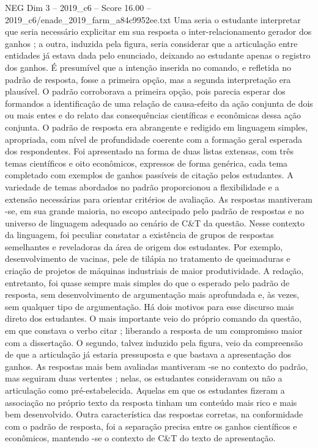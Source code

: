 \begin{textsample}{NEG Dim 3 – 2019\_c6 – Score 16.00 – 2019\_c6/enade\_2019\_farm\_a84c9952ee.txt}
Uma seria o estudante interpretar que seria necessário explicitar em sua resposta o inter-relacionamento gerador dos ganhos ; a outra, induzida pela figura, seria considerar que a articulação entre entidades já estava dada pelo enunciado, deixando ao estudante apenas o registro dos ganhos.
É presumível que a intenção inserida no comando, e refletida no padrão de resposta, fosse a primeira opção, mas a segunda interpretação era plausível.
O padrão corroborava a primeira opção, pois parecia esperar dos formandos a identificação de uma relação de causa-efeito da ação conjunta de dois ou mais entes e do relato das consequências científicas e econômicas dessa ação conjunta.
O padrão de resposta era abrangente e redigido em linguagem simples, apropriada, com nível de profundidade coerente com a formação geral esperada dos respondentes.
Foi apresentado na forma de duas listas extensas, com três temas científicos e oito econômicos, expressos de forma genérica, cada tema completado com exemplos de ganhos passíveis de citação pelos estudantes.
A variedade de temas abordados no padrão proporcionou a flexibilidade e a extensão necessárias para orientar critérios de avaliação.
As respostas mantiveram -se, em sua grande maioria, no escopo antecipado pelo padrão de respostas e no universo de linguagem adequado ao cenário de C\&T da questão.
Nesse contexto da linguagem, foi peculiar constatar a existência de grupos de respostas semelhantes e reveladoras da área de origem dos estudantes.
Por exemplo, desenvolvimento de vacinas, pele de tilápia no tratamento de queimaduras e criação de projetos de máquinas industriais de maior produtividade.
A redação, entretanto, foi quase sempre mais simples do que o esperado pelo padrão de resposta, sem desenvolvimento de argumentação mais aprofundada e, às vezes, sem qualquer tipo de argumentação.
Há dois motivos para esse discurso mais direto dos estudantes.
O mais importante veio do próprio comando da questão, em que constava o verbo citar ; liberando a resposta de um compromisso maior com a dissertação.
O segundo, talvez induzido pela figura, veio da compreensão de que a articulação já estaria pressuposta e que bastava a apresentação dos ganhos.
As respostas mais bem avaliadas mantiveram -se no contexto do padrão, mas seguiram duas vertentes ; nelas, os estudantes consideravam ou não a articulação como pré-estabelecida.
Aquelas em que os estudantes fizeram a associação no próprio texto da resposta tinham um conteúdo mais rico e mais bem desenvolvido.
Outra característica das respostas corretas, na conformidade com o padrão de resposta, foi a separação precisa entre os ganhos científicos e econômicos, mantendo -se o contexto de C\&T do texto de apresentação.

\end{textsample}
